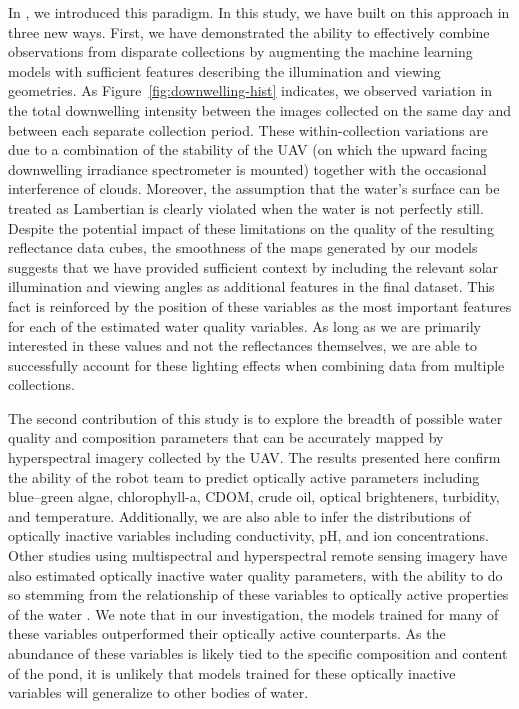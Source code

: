 \documentclass[remotesensing,article,accept,pdftex,moreauthors]{Definitions/mdpi}
\begin{document}
In \cite{robotTeam1}, we introduced this paradigm. In this study, we have built on this approach in three new ways. First, we have demonstrated the ability to effectively combine observations from disparate collections by augmenting the machine learning models with sufficient features describing the illumination and viewing geometries. As Figure~\ref{fig:downwelling-hist} indicates, we observed variation in the total downwelling intensity between the images collected on the same day and between each separate collection period. These within-collection variations are due to a combination of the stability of the UAV (on which the upward facing downwelling irradiance spectrometer is mounted) together with the occasional interference of clouds. Moreover, the assumption that the water's surface can be treated as Lambertian is clearly violated when the water is not perfectly still. Despite the potential impact of these limitations on the quality of the resulting reflectance data cubes, the smoothness of the maps generated by our models suggests that we have provided sufficient context by including the relevant solar illumination and viewing angles as additional features in the final dataset.  This fact is reinforced by the position of these variables as the most important features for each of the estimated water quality variables. As long as we are primarily interested in these values and not the reflectances themselves, we are able to successfully account for these lighting effects when combining data from multiple collections.

The second contribution of this study is to explore the breadth of possible water quality and composition parameters that can be accurately mapped by hyperspectral imagery collected by the UAV. The results presented here confirm the ability of the robot team to predict optically active parameters including blue--green algae, chlorophyll-a, CDOM, crude oil, optical brighteners, turbidity, and temperature. Additionally, we are also able to infer the distributions of optically inactive variables including conductivity, pH, and ion concentrations. Other studies using multispectral and hyperspectral remote sensing imagery have also estimated optically inactive water quality parameters, with the ability to do so stemming from the relationship of these variables to optically active properties of the water \cite{vakili2020determination,guo2021machine,niu2021deep}. We note that in our investigation, the models trained for many of these variables outperformed their optically active counterparts. As the abundance of these variables is likely tied to the specific composition and content of the pond, it is unlikely that models trained for these optically inactive variables will generalize to other bodies of water. 
\end{document}
